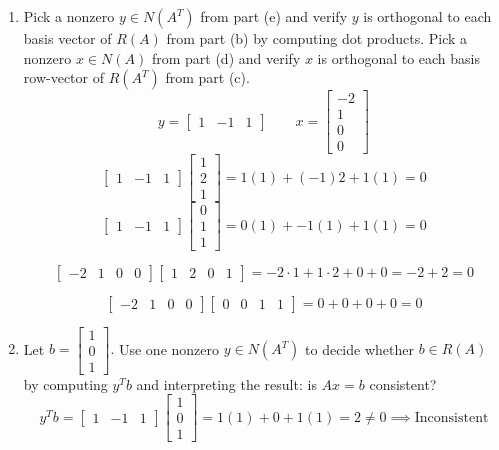 \documentclass[9pt]{article}
\theoremstyle{plain}
\begin{document}
\begin{enumerate}
	\item[(g)] Pick a nonzero $y\in N(A^{T})$ from part (e) and verify $y$ is orthogonal to each basis vector of $R(A)$ from part (b) by computing dot products. Pick a nonzero $x\in N(A)$ from part (d) and verify $x$ is orthogonal to each basis row-vector of $R(A^{T})$ from part (c).
	      \[
		      y = \begin{bmatrix}
			      1 & -1 & 1
		      \end{bmatrix} \quad \quad
		      x = \begin{bmatrix}
			      -2 \\ 1 \\ 0 \\ 0
		      \end{bmatrix}
	      \]
	      \[
		      \begin{bmatrix} 1 &  -1 &  1 \end{bmatrix}
		      \begin{bmatrix}
			      1 \\ 2 \\ 1
		      \end{bmatrix} = 1(1) + (-1)2 + 1(1) = 0
	      \]
	      \[
		      \begin{bmatrix} 1 &  -1 &  1 \end{bmatrix}
		      \begin{bmatrix}
			      0 \\ 1 \\ 1
		      \end{bmatrix} = 0(1) + -1(1) + 1(1) = 0
	      \]

	      \[
		      \begin{bmatrix} -2 & 1 & 0 & 0 \end{bmatrix}  \begin{bmatrix} 1 & 2 & 0 & 1 \end{bmatrix}
		      = -2 \cdot 1 + 1 \cdot 2 + 0 + 0 = -2 + 2 = 0
	      \]

	      \[
		      \begin{bmatrix} -2 & 1 & 0 & 0 \end{bmatrix}  \begin{bmatrix} 0 & 0 & 1 & 1 \end{bmatrix}
		      = 0 + 0 + 0 + 0 = 0
	      \]
	\item[(h)] Let $b=\begin{bmatrix}1\\ 0\\ 1\end{bmatrix}.$ Use one nonzero $y\in N(A^{T})$ to decide whether $b\in R(A)$ by computing $y^{T}b$ and interpreting the result: is $Ax=b$ consistent?
	      \[
		      y^Tb =
		      \begin{bmatrix} 1 & -1 & 1 \end{bmatrix}
		      \begin{bmatrix} 1 \\ 0 \\ 1 \end{bmatrix}
		      = 1(1) + 0 + 1(1) = 2 \neq 0 \implies \text{Inconsistent}
	      \]
\end{enumerate}
\end{document}
